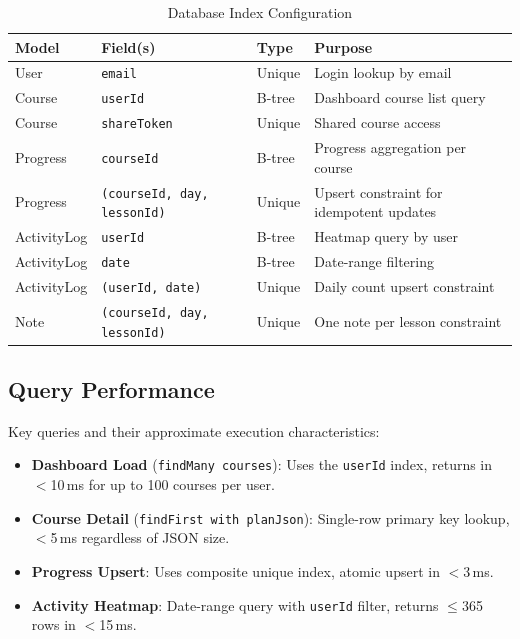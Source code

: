 \documentclass[12pt,a4paper]{report}
\begin{document}
\begin{table}[H]
\centering
\caption{Database Index Configuration}
\label{tab:db-indexes}
\begin{tabularx}{\textwidth}{l l l X}
\toprule
\textbf{Model} & \textbf{Field(s)} & \textbf{Type} & \textbf{Purpose} \\
\midrule
User      & \texttt{email}                & Unique   & Login lookup by email \\
Course    & \texttt{userId}               & B-tree   & Dashboard course list query \\
Course    & \texttt{shareToken}           & Unique   & Shared course access \\
Progress  & \texttt{courseId}             & B-tree   & Progress aggregation per course \\
Progress  & \texttt{(courseId, day, lessonId)} & Unique & Upsert constraint for idempotent updates \\
ActivityLog & \texttt{userId}             & B-tree   & Heatmap query by user \\
ActivityLog & \texttt{date}               & B-tree   & Date-range filtering \\
ActivityLog & \texttt{(userId, date)}     & Unique   & Daily count upsert constraint \\
Note      & \texttt{(courseId, day, lessonId)} & Unique & One note per lesson constraint \\
\bottomrule
\end{tabularx}
\end{table}

\subsection{Query Performance}
Key queries and their approximate execution characteristics:
\begin{itemize}[noitemsep]
    \item \textbf{Dashboard Load} (\texttt{findMany courses}): Uses the \texttt{userId} index, returns in $<$10\,ms for up to 100 courses per user.
    \item \textbf{Course Detail} (\texttt{findFirst with planJson}): Single-row primary key lookup, $<$5\,ms regardless of JSON size.
    \item \textbf{Progress Upsert}: Uses composite unique index, atomic upsert in $<$3\,ms.
    \item \textbf{Activity Heatmap}: Date-range query with \texttt{userId} filter, returns $\leq$365 rows in $<$15\,ms.
\end{itemize}
\end{document}
